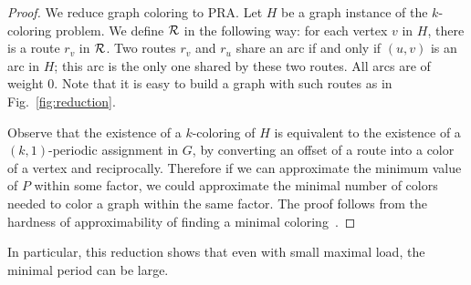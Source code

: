\documentclass[10pt, conference, letterpaper]{IEEEtran}
\begin{document}
\begin{proof}
 We reduce graph coloring to PRA. Let $H$ be a graph instance of the $k$-coloring problem. 
 We define ${\cal R}$ in the following way: for each vertex $v$ in $H$, there is a route $r_v$ in ${\cal R}$.
 Two routes $r_v$ and $r_u$ share an arc if and only if $(u,v)$ is an arc in $H$; this arc is the only one shared by these two routes. All arcs are of weight $0$. Note that it is easy to build a graph with such routes as in Fig.~\ref{fig:reduction}.
 
 Observe that the existence of a $k$-coloring of $H$ is equivalent to the existence of a $(k,1)$-periodic assignment in $G$, 
 by converting an offset of a route into a color of a vertex and reciprocally. Therefore if we can approximate the minimum value of $P$ within some factor, we could approximate the minimal number of colors needed to color a graph within the same factor. The proof follows from the hardness of approximability of finding a minimal coloring~\cite{zuckerman2006linear}.
\end{proof}


In particular, this reduction shows that even with small maximal load, the minimal period can be large.
\end{document}
